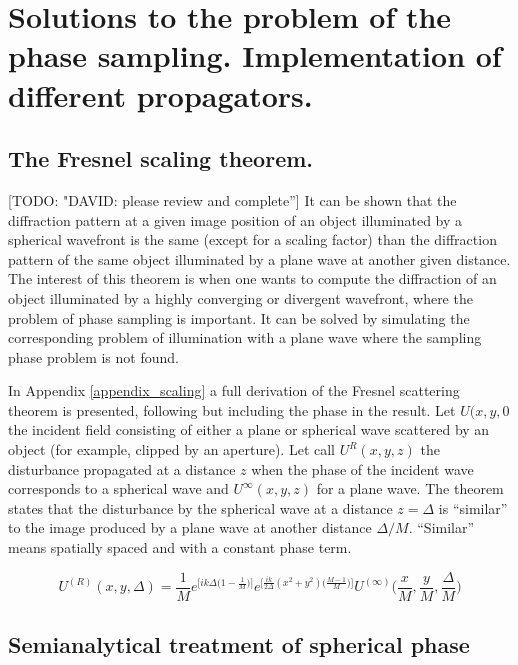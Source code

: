 \documentclass{iucr}              %
\newcommand{\todo}[1]{{\color{red}[TODO: "#1'']}}
\begin{document}
\section{Solutions to the problem of the phase sampling. Implementation of different propagators.}
\label{ch: spherical fronts}

\subsection{The Fresnel scaling theorem.}
\todo{DAVID: please review and complete}
It can be shown that the diffraction pattern at a given image position of an object illuminated by a spherical wavefront is the same (except for a scaling factor) than the diffraction pattern of the same object illuminated by a plane wave at another given distance. 
The interest of this theorem is when one wants to compute the diffraction of an object illuminated by a highly converging or divergent wavefront, where the problem of phase sampling is important. It can be solved by simulating the corresponding problem of illumination with a plane wave where the sampling phase problem is not found.

In Appendix \ref{appendix_scaling} a full derivation of the Fresnel scattering theorem is presented, following \cite{paganin_book} but including the phase in the result. Let $U(x,y,0$ the incident field consisting of either a plane or spherical wave scattered by an object (for example, clipped by an aperture). Let call $U^R(x,y,z)$ the disturbance propagated at a distance $z$ when the phase of the incident wave corresponds to a spherical wave and $U^\infty(x,y,z)$ for a plane wave. The theorem states that the disturbance by the spherical wave at a distance $z=\Delta$ is ``similar'' to the image produced by a plane wave at another distance $\Delta/M$. ``Similar'' means spatially spaced and with a constant phase term.

\begin{equation}
	U^{(R)}(x, y, \Delta)= \frac{1}{M} e^{\big[ik\Delta \big({1-\frac{1}{M}}\big)\big]} e^{\big[\frac{ik}{2\Delta}(x^2+y^2)\big(\frac{M-1}{M}\big)\big]} U^{(\infty)}\Big(\frac{x}{M}, \frac{y}{M}, \frac{\Delta}{M}\Big)
\end{equation}


\subsection{Semianalytical treatment of spherical phase}
\end{document}

